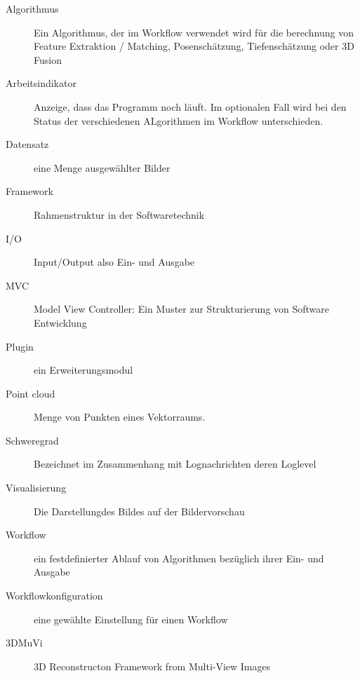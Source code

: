 
\begin{description}
	\item[Algorithmus] Ein Algorithmus, der im Workflow verwendet wird für die berechnung von Feature Extraktion / Matching, Posenschätzung, Tiefenschätzung oder 3D Fusion
	\item[Arbeitsindikator] Anzeige, dass das Programm noch läuft. Im optionalen Fall wird bei den Status der verschiedenen ALgorithmen im Workflow unterschieden.
	\item [Datensatz] eine Menge ausgewählter Bilder
	\item[Framework] Rahmenstruktur in der Softwaretechnik
	\item[I/O] Input/Output also Ein- und Ausgabe
	\item[MVC] Model View Controller: Ein Muster zur Strukturierung von Software Entwicklung
	\item[Plugin] ein Erweiterungsmodul 
	\item[Point cloud] Menge von Punkten eines Vektorraums.
	\item[Schweregrad] Bezeichnet im Zusammenhang mit Lognachrichten deren Loglevel
	\item[Visualisierung] Die Darstellungdes Bildes auf der Bildervorschau
	\item [Workflow] ein festdefinierter Ablauf von Algorithmen bezüglich ihrer Ein- und Ausgabe
	\item [Workflowkonfiguration] eine gewählte Einstellung für einen Workflow
	\item[3DMuVi] 3D Reconstructon Framework from Multi-View Images
\end{description}
